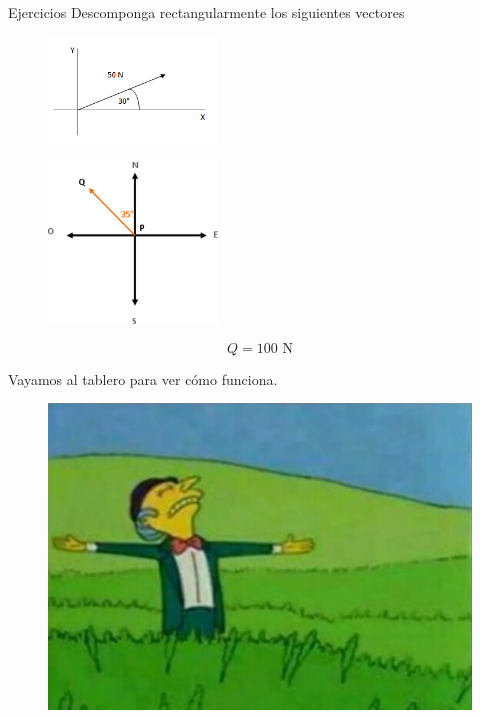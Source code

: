 \begin{frame}{Ejercicios}
    Descomponga rectangularmente los siguientes vectores 
    
    \begin{multicols}{2}
        
        \begin{figure}[H]
            \includegraphics[width=0.4\textwidth]{figures/composicion-y-descomposicion-1.jpg}
        \end{figure}
        
        
        \begin{figure}[H]
            \includegraphics[width=0.4\textwidth]{figures/suma2.jpg}
        \end{figure}
        
        $$Q = 100 \text{ N}$$
        
    \end{multicols}
\end{frame}

\begin{frame}
\begin{center}
    \Large Vayamos al tablero para ver cómo funciona.
    \begin{figure}
    \centering
    \includegraphics[width=0.6\linewidth]{figures/imagen1.png}
\end{figure}
\end{center}
\end{frame}

